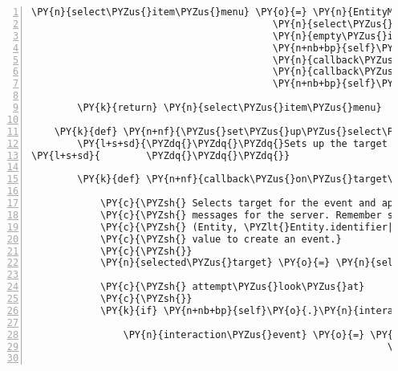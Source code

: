 \begin{Verbatim}[commandchars=\\\{\},numbers=left,firstnumber=1,stepnumber=1]
        \PY{n}{select\PYZus{}item\PYZus{}menu} \PY{o}{=} \PY{n}{EntityMenuList}\PY{p}{(}\PY{p}{[}\PY{p}{]}\PY{p}{,}
                                          \PY{n}{select\PYZus{}item\PYZus{}menu\PYZus{}sound}\PY{p}{,}
                                          \PY{n}{empty\PYZus{}item\PYZus{}menu\PYZus{}sound}\PY{p}{,}
                                          \PY{n+nb+bp}{self}\PY{o}{.}\PY{n}{channel\PYZus{}system}\PY{p}{,}
                                          \PY{n}{callback\PYZus{}on\PYZus{}item\PYZus{}selected}\PY{p}{,}
                                          \PY{n}{callback\PYZus{}on\PYZus{}item\PYZus{}menu\PYZus{}exit}\PY{p}{,}
                                          \PY{n+nb+bp}{self}\PY{o}{.}\PY{n}{tts\PYZus{}engine}\PY{p}{)}

        \PY{k}{return} \PY{n}{select\PYZus{}item\PYZus{}menu}

    \PY{k}{def} \PY{n+nf}{\PYZus{}set\PYZus{}up\PYZus{}select\PYZus{}target\PYZus{}menu}\PY{p}{(}\PY{n+nb+bp}{self}\PY{p}{)}\PY{p}{:}
        \PY{l+s+sd}{\PYZdq{}\PYZdq{}\PYZdq{}Sets up the target selection menu list.}
\PY{l+s+sd}{        \PYZdq{}\PYZdq{}\PYZdq{}}

        \PY{k}{def} \PY{n+nf}{callback\PYZus{}on\PYZus{}target\PYZus{}selected}\PY{p}{(}\PY{n}{select\PYZus{}target\PYZus{}menu}\PY{p}{)}\PY{p}{:}

            \PY{c}{\PYZsh{} Selects target for the event and appends the resulting event to}
            \PY{c}{\PYZsh{} messages for the server. Remember selected target is a tuple of}
            \PY{c}{\PYZsh{} (Entity, \PYZlt{}Entity.identifier|location\PYZgt{}) and we need the second}
            \PY{c}{\PYZsh{} value to create an event.}
            \PY{c}{\PYZsh{}}
            \PY{n}{selected\PYZus{}target} \PY{o}{=} \PY{n}{select\PYZus{}target\PYZus{}menu}\PY{o}{.}\PY{n}{list}\PY{p}{[}\PY{n}{select\PYZus{}target\PYZus{}menu}\PY{o}{.}\PY{n}{list\PYZus{}index}\PY{p}{]}\PY{p}{[}\PY{l+m+mi}{1}\PY{p}{]}

            \PY{c}{\PYZsh{} attempt\PYZus{}look\PYZus{}at}
            \PY{c}{\PYZsh{}}
            \PY{k}{if} \PY{n+nb+bp}{self}\PY{o}{.}\PY{n}{interaction\PYZus{}sound\PYZus{}menu}\PY{o}{.}\PY{n}{list\PYZus{}index} \PY{o}{==} \PY{n+nb+bp}{self}\PY{o}{.}\PY{n}{ATTEMPT\PYZus{}LOOK\PYZus{}AT}\PY{p}{:}

                \PY{n}{interaction\PYZus{}event} \PY{o}{=} \PY{n}{fabula}\PY{o}{.}\PY{n}{TriesToLookAtEvent}\PY{p}{(}\PY{n+nb+bp}{self}\PY{o}{.}\PY{n}{host}\PY{o}{.}\PY{n}{client\PYZus{}id}\PY{p}{,}
                                                              \PY{n}{selected\PYZus{}target}\PY{p}{)}


\end{Verbatim}
